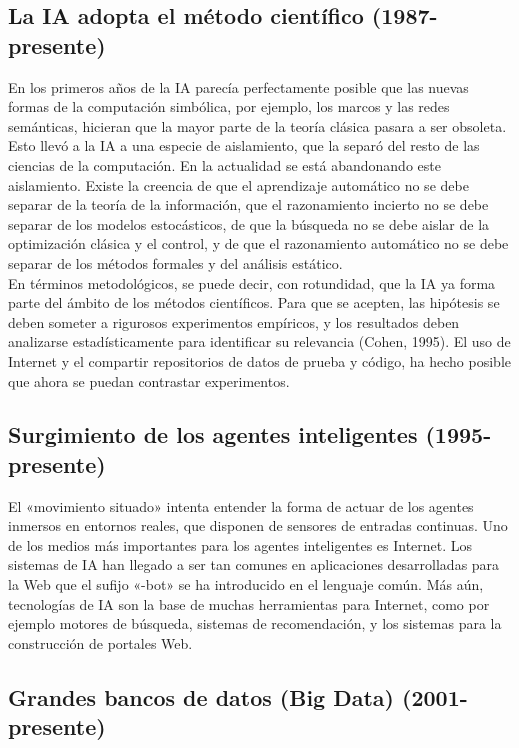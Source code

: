 \documentclass[12pt,a4paper]{report}
\begin{document}
\subsection*{La IA adopta el método científico (1987-presente)}

En los primeros años de la IA parecía perfectamente posible que las nuevas formas de la computación simbólica, por ejemplo, los marcos y las redes semánticas, hicieran que la mayor parte de la teoría clásica pasara a ser obsoleta. Esto llevó a la IA a una especie de aislamiento, que la separó del resto de las ciencias de la computación. En la actualidad se está abandonando este aislamiento. Existe la creencia de que el aprendizaje automático no se debe separar de la teoría de la información, que el razonamiento incierto no se debe separar de los modelos estocásticos, de que la búsqueda no se debe aislar de la optimización clásica y el control, y de que el razonamiento automático no se debe separar de los métodos formales y del análisis estático.\\En términos metodológicos, se puede decir, con rotundidad, que la IA ya forma parte del ámbito de los métodos científicos. Para que se acepten, las hipótesis se deben someter a rigurosos experimentos empíricos, y los resultados deben analizarse estadísticamente para identificar su relevancia (Cohen, 1995). El uso de Internet y el compartir repositorios de datos de prueba y código, ha hecho posible que ahora se puedan contrastar experimentos.
\subsection*{Surgimiento de los agentes inteligentes (1995-presente)}
El «movimiento situado» intenta entender la forma de actuar de los agentes inmersos en entornos reales, que disponen de sensores de entradas continuas. Uno de los medios más importantes para los agentes inteligentes es Internet. Los sistemas de IA han llegado a ser tan comunes en aplicaciones desarrolladas para la Web que el sufijo «-bot» se ha introducido en el lenguaje común. Más aún, tecnologías de IA son la base de muchas herramientas para Internet, como por ejemplo motores de búsqueda, sistemas de recomendación, y los sistemas para la construcción de portales Web.
\subsection*{Grandes bancos de datos (Big Data) (2001-presente)}
\end{document}
